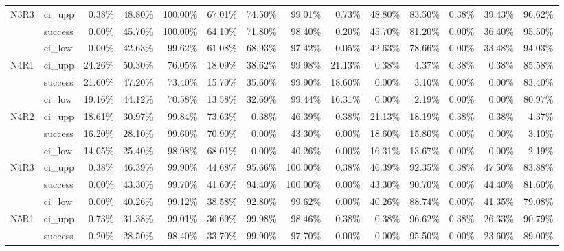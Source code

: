 \begin{tabular}{llrrrrrrrrrrrr}
N3R3 & ci\_upp &       0.38\% & 48.80\% & 100.00\% & 67.01\% &  74.50\% &  99.01\% &        0.73\% & 48.80\% & 83.50\% &  0.38\% & 39.43\% & 96.62\% \\
     & success &       0.00\% & 45.70\% & 100.00\% & 64.10\% &  71.80\% &  98.40\% &        0.20\% & 45.70\% & 81.20\% &  0.00\% & 36.40\% & 95.50\% \\
     & ci\_low &       0.00\% & 42.63\% &  99.62\% & 61.08\% &  68.93\% &  97.42\% &        0.05\% & 42.63\% & 78.66\% &  0.00\% & 33.48\% & 94.03\% \\
N4R1 & ci\_upp &      24.26\% & 50.30\% &  76.05\% & 18.09\% &  38.62\% &  99.98\% &       21.13\% &  0.38\% &  4.37\% &  0.38\% &  0.38\% & 85.58\% \\
     & success &      21.60\% & 47.20\% &  73.40\% & 15.70\% &  35.60\% &  99.90\% &       18.60\% &  0.00\% &  3.10\% &  0.00\% &  0.00\% & 83.40\% \\
     & ci\_low &      19.16\% & 44.12\% &  70.58\% & 13.58\% &  32.69\% &  99.44\% &       16.31\% &  0.00\% &  2.19\% &  0.00\% &  0.00\% & 80.97\% \\
N4R2 & ci\_upp &      18.61\% & 30.97\% &  99.84\% & 73.63\% &   0.38\% &  46.39\% &        0.38\% & 21.13\% & 18.19\% &  0.38\% &  0.38\% &  4.37\% \\
     & success &      16.20\% & 28.10\% &  99.60\% & 70.90\% &   0.00\% &  43.30\% &        0.00\% & 18.60\% & 15.80\% &  0.00\% &  0.00\% &  3.10\% \\
     & ci\_low &      14.05\% & 25.40\% &  98.98\% & 68.01\% &   0.00\% &  40.26\% &        0.00\% & 16.31\% & 13.67\% &  0.00\% &  0.00\% &  2.19\% \\
N4R3 & ci\_upp &       0.38\% & 46.39\% &  99.90\% & 44.68\% &  95.66\% & 100.00\% &        0.38\% & 46.39\% & 92.35\% &  0.38\% & 47.50\% & 83.88\% \\
     & success &       0.00\% & 43.30\% &  99.70\% & 41.60\% &  94.40\% & 100.00\% &        0.00\% & 43.30\% & 90.70\% &  0.00\% & 44.40\% & 81.60\% \\
     & ci\_low &       0.00\% & 40.26\% &  99.12\% & 38.58\% &  92.80\% &  99.62\% &        0.00\% & 40.26\% & 88.74\% &  0.00\% & 41.35\% & 79.08\% \\
N5R1 & ci\_upp &       0.73\% & 31.38\% &  99.01\% & 36.69\% &  99.98\% &  98.46\% &        0.38\% &  0.38\% & 96.62\% &  0.38\% & 26.33\% & 90.79\% \\
     & success &       0.20\% & 28.50\% &  98.40\% & 33.70\% &  99.90\% &  97.70\% &        0.00\% &  0.00\% & 95.50\% &  0.00\% & 23.60\% & 89.00\% \\

\end{tabular}
